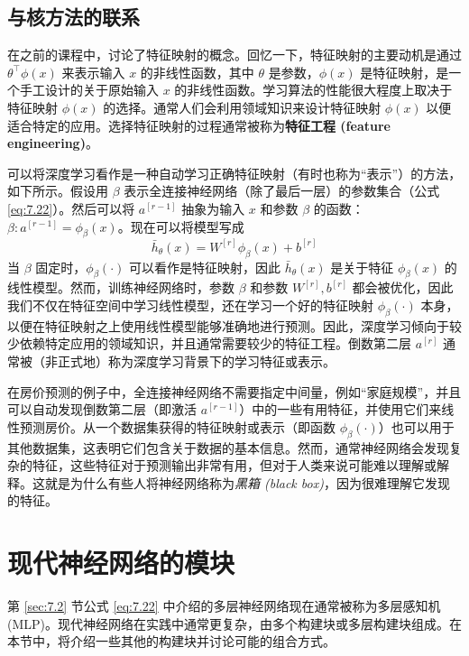 \subsection*{与核方法的联系}

在之前的课程中，讨论了特征映射的概念。回忆一下，特征映射的主要动机是通过 $\theta^\top \phi(x)$ 来表示输入 $x$ 的非线性函数，其中 $\theta$ 是参数，$\phi(x)$ 是特征映射，是一个手工设计的关于原始输入 $x$ 的非线性函数。学习算法的性能很大程度上取决于特征映射 $\phi(x)$ 的选择。通常人们会利用领域知识来设计特征映射 $\phi(x)$ 以便适合特定的应用。选择特征映射的过程通常被称为\textbf{特征工程 (feature engineering)}。

可以将深度学习看作是一种自动学习正确特征映射（有时也称为“表示”）的方法，如下所示。假设用 $\beta$ 表示全连接神经网络（除了最后一层）的参数集合（公式 \eqref{eq:7.22}）。然后可以将 $a^{[r-1]}$ 抽象为输入 $x$ 和参数 $\beta$ 的函数：$\beta: a^{[r-1]} = \phi_\beta(x)$。现在可以将模型写成
\begin{equation}
    \bar{h}_\theta(x) = W^{[r]} \phi_\beta(x) + b^{[r]} \label{eq:7.34}
\end{equation}
当 $\beta$ 固定时，$\phi_\beta(\cdot)$ 可以看作是特征映射，因此 $\bar{h}_\theta(x)$ 是关于特征 $\phi_\beta(x)$ 的线性模型。然而，训练神经网络时，参数 $\beta$ 和参数 $W^{[r]}, b^{[r]}$ 都会被优化，因此我们不仅在特征空间中学习线性模型，还在学习一个好的特征映射 $\phi_\beta(\cdot)$ 本身，以便在特征映射之上使用线性模型能够准确地进行预测。因此，深度学习倾向于较少依赖特定应用的领域知识，并且通常需要较少的特征工程。倒数第二层 $a^{[r]}$ 通常被（非正式地）称为深度学习背景下的学习特征或表示。

在房价预测的例子中，全连接神经网络不需要指定中间量，例如“家庭规模”，并且可以自动发现倒数第二层（即激活 $a^{[r-1]}$）中的一些有用特征，并使用它们来线性预测房价。从一个数据集获得的特征映射或表示（即函数 $\phi_\beta(\cdot)$）也可以用于其他数据集，这表明它们包含关于数据的基本信息。然而，通常神经网络会发现复杂的特征，这些特征对于预测输出非常有用，但对于人类来说可能难以理解或解释。这就是为什么有些人将神经网络称为\textit{黑箱 (black box)}，因为很难理解它发现的特征。

\section{现代神经网络的模块}\label{sec:7.3}

第 \ref{sec:7.2} 节公式 \eqref{eq:7.22} 中介绍的多层神经网络现在通常被称为多层感知机 (MLP)。现代神经网络在实践中通常更复杂，由多个构建块或多层构建块组成。在本节中，将介绍一些其他的构建块并讨论可能的组合方式。

